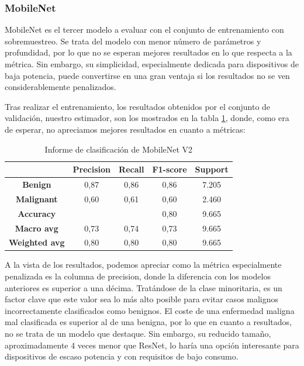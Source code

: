 \subsubsection{MobileNet}

MobileNet es el tercer modelo a evaluar con el conjunto de entrenamiento con sobremuestreo. Se trata del modelo con menor número de parámetros y profundidad, por lo que no se esperan mejores resultados en lo que respecta  a la métrica. Sin embargo, su simplicidad, especialmente dedicada para dispositivos de baja potencia, puede convertirse en una gran ventaja si los resultados no se ven considerablemente penalizados.

Tras realizar el entrenamiento, los resultados obtenidos por el conjunto de validación, nuestro estimador, son los mostrados en la tabla \ref{tab:mob}, donde, como era de esperar, no apreciamos mejores resultados en cuanto a métricas:   

\begin{table}[H]
	\centering
	\begin{tabular}{|c|c|c|c|c|}
		\hline
		\textbf{} & \textbf{Precision} & \textbf{Recall} & \textbf{F1-score} & \textbf{Support} \\ \hline
		\textbf{Benign} & 0,87 & 0,86 & 0,86 & 7.205 \\ \hline
		\textbf{Malignant} & 0,60 & 0,61 & 0,60 & 2.460 \\ \hline
		\textbf{Accuracy} &  &  & 0,80 & 9.665 \\ \hline
		\textbf{Macro avg} & 0,73 & 0,74 & 0,73 & 9.665 \\ \hline
		\textbf{Weighted avg} & 0,80& 0,80 & 0,80 & 9.665 \\ \hline
	\end{tabular}
	\caption{Informe de clasificación de MobileNet V2}
	\label{tab:mob}
\end{table}

A la vista de los resultados, podemos apreciar como la métrica especialmente penalizada es la columna de precision, donde la diferencia con los modelos anteriores es superior a una décima. Tratándose de la clase minoritaria, es un factor clave que este valor sea lo más alto posible para evitar casos malignos incorrectamente clasificados como benignos. El coste de una enfermedad maligna mal clasificada es superior al de una benigna, por lo que en cuanto a resultados, no se trata de un modelo que destaque. Sin embargo, su reducido tamaño, aproximadamente 4 veces menor que ResNet, lo haría una opción interesante para dispositivos de escaso potencia y con requisitos de bajo consumo.

